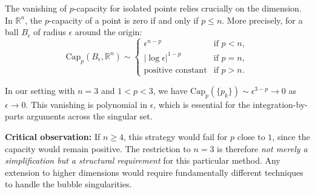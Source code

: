 \begin{remark}\label{rem:DimensionalRestriction}
The vanishing of $p$-capacity for isolated points relies crucially on the dimension. In $\mathbb{R}^n$, the $p$-capacity of a point is zero if and only if $p \le n$. More precisely, for a ball $B_\epsilon$ of radius $\epsilon$ around the origin:
\begin{equation}
    \text{Cap}_p(B_\epsilon, \mathbb{R}^n) \sim \begin{cases}
        \epsilon^{n-p} & \text{if } p < n, \\
        |\log \epsilon|^{1-p} & \text{if } p = n, \\
        \text{positive constant} & \text{if } p > n.
    \end{cases}
\end{equation}

In our setting with $n = 3$ and $1 < p < 3$, we have $\text{Cap}_p(\{p_k\}) \sim \epsilon^{3-p} \to 0$ as $\epsilon \to 0$. This vanishing is polynomial in $\epsilon$, which is essential for the integration-by-parts arguments across the singular set.

\textbf{Critical observation:} If $n \ge 4$, this strategy would fail for $p$ close to $1$, since the capacity would remain positive. The restriction to $n = 3$ is therefore \emph{not merely a simplification but a structural requirement} for this particular method. Any extension to higher dimensions would require fundamentally different techniques to handle the bubble singularities.
\end{remark}

